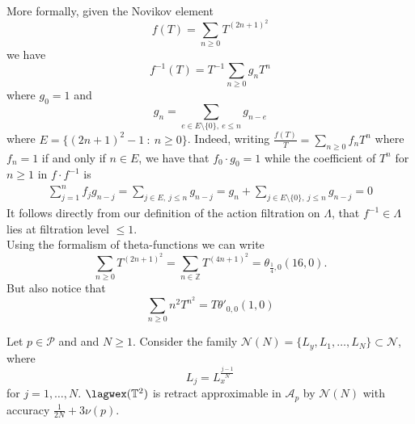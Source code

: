 \begin{rem}
	More formally, given the Novikov element $$f(T)= \sum_{n\geq0}T^{(2n+1)^2}$$ we have $$f^{-1}(T) = T^{-1}\sum_{n\geq 0}g_nT^n$$ where $g_0=1$ and $$g_n = \sum_{e\in E\setminus\{0\}, \ e\leq n}g_{n-e}$$ where $E= \{(2n+1)^2-1\ : \ n\geq 0\}$. Indeed, writing $\frac{f(T)}{T}= \sum_{n\geq 0}f_nT^n$ where $f_n =1 $ if and only if $n\in E$, we have that $f_0\cdot g_0=1$ while the coefficient of $T^n$ for $n\geq 1$ in $f\cdot f^{-1}$ is 
	\begin{align*}
		\sum_{j=1}^nf_jg_{n-j} = \sum_{j\in E, \ j\leq n}g_{n-j} = g_n+  \sum_{j\in E\setminus\{0\}, \ j\leq n}g_{n-j}=0
	\end{align*}
	It follows directly from our definition of the action filtration on $\Lambda$, that $f^{-1}\in \Lambda$ lies at filtration level $\leq 1$.\\
	Using the formalism of theta-functions we can write $$\sum_{n\geq 0}T^{(2n+1)^2}= \sum_{n\in \mathbb Z}T^{(4n+1)^2}=\theta_{\frac{1}{4},0}(16,0).$$ But also notice that $$\sum_{n\geq 0}n^2T^{n^2}=T\theta'_{0,0}(1,0)$$
\end{rem}
\begin{prop}\label{prop235}
	Let $p\in \mathcal{P}$ and and $N\geq 1$. Consider the family $\mathcal{N}(N)= \{L_y,L_1,\ldots, L_N\}\subset \mathcal{N}$, where $$L_j=L_x^{\frac{j-1}{N}}$$ for $j=1,\ldots, N$. $\lagwex(\mathbb{T}^2)$ is retract approximable in $\mathcal{A}_p$ by $\mathcal{N}(N)$ with accuracy $\frac{1}{2N}+ 3\nu(p)$.%
\end{prop}
%

